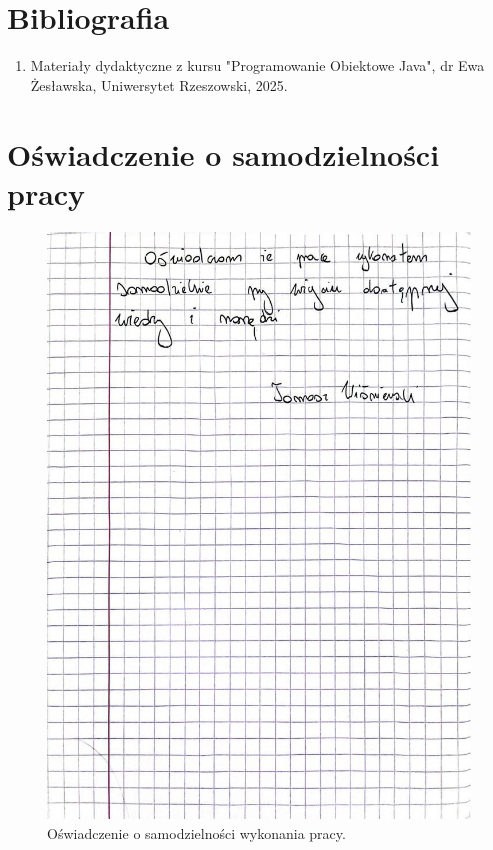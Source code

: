 \documentclass[12pt, a4paper]{article}
\begin{document}
\newpage
\section*{Bibliografia}
\begin{enumerate}
    \item Materiały dydaktyczne z kursu "Programowanie Obiektowe Java", dr Ewa Żesławska, Uniwersytet Rzeszowski, 2025.
\end{enumerate}

\appendix
\section{Oświadczenie o samodzielności pracy}

\begin{figure}[H]
 \centering
 \includegraphics[width=\textwidth]{oswiadczenie.jpeg}
 \caption{Oświadczenie o samodzielności wykonania pracy.}
 \label{fig:oswiadczenie}
\end{figure}
\end{document}
